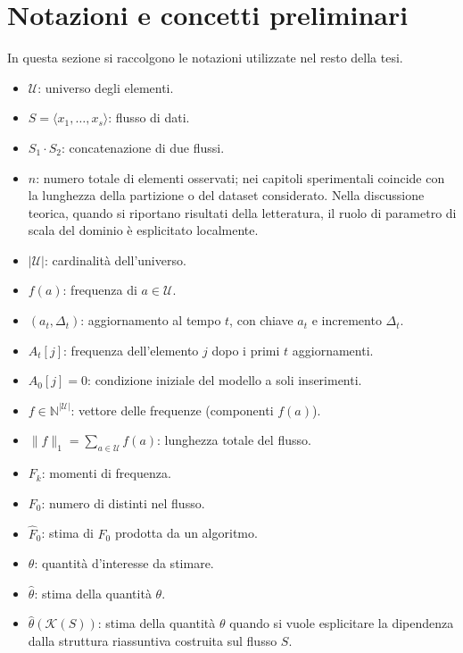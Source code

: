 
\chapter*{Notazioni e concetti preliminari}
\label{chp:notazioni}

In questa sezione si raccolgono le notazioni utilizzate nel resto della tesi.
\begin{itemize}
    \item $\mathcal{U}$: universo degli elementi.
    \item $S = \langle x_1, \dots, x_s \rangle$: flusso di dati.
    \item $S_1 \cdot S_2$: concatenazione di due flussi.
    \item $n$: numero totale di elementi osservati; nei capitoli sperimentali coincide con la lunghezza della partizione o del dataset considerato. Nella discussione teorica, quando si riportano risultati della letteratura, il ruolo di parametro di scala del dominio è esplicitato localmente.
    \item $|\mathcal{U}|$: cardinalità dell'universo.
    \item $f(a)$: frequenza di $a \in \mathcal{U}$.
    \item $(a_t,\Delta_t)$: aggiornamento al tempo $t$, con chiave $a_t$ e incremento $\Delta_t$.
    \item $A_t[j]$: frequenza dell'elemento $j$ dopo i primi $t$ aggiornamenti.
    \item $A_0[j]=0$: condizione iniziale del modello a soli inserimenti.
    \item $f \in \mathbb{N}^{|\mathcal{U}|}$: vettore delle frequenze (componenti $f(a)$).
    \item $\|f\|_1 = \sum_{a\in\mathcal{U}} f(a)$: lunghezza totale del flusso.
    \item $F_k$: momenti di frequenza.
    \item $F_0$: numero di distinti nel flusso.
    \item $\hat{F}_0$: stima di $F_0$ prodotta da un algoritmo.
    \item $\theta$: quantità d'interesse da stimare.
    \item $\hat{\theta}$: stima della quantità $\theta$.
    \item $\hat{\theta}(\mathcal{K}(S))$: stima della quantità $\theta$ quando si vuole esplicitare la dipendenza dalla struttura riassuntiva costruita sul flusso $S$.

\end{itemize}
